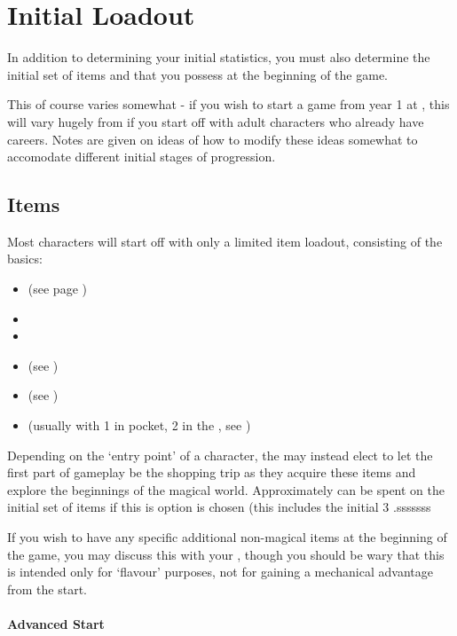 \chapter{Initial Loadout}

In addition to determining your initial statistics, you must also determine the initial set of items and  that you possess at the beginning of the game. 

This of course varies somewhat - if you wish to start a game from year 1 at , this will vary hugely from if you start off with adult characters who already have careers. Notes are given on ideas of how to modify these ideas somewhat to accomodate different initial stages of progression. 

\section{Items}

Most characters will start off with only a limited item loadout, consisting of the basics:

\begin{itemize}
	\item {} (see page \pageref{S:Wandchoosing})
	\item {}
	\item {}
	\item {} (see \pageref{S:Books})
	\item {} (see \pageref{S:Tools})
	\item {} (usually with 1 in pocket, 2 in the , see \pageref{S:Money})
\end{itemize}

Depending on the `entry point' of a character, the  may instead elect to let the first part of gameplay be the  shopping trip as they acquire these items and explore the beginnings of the magical world. Approximately  can be spent on the initial set of items if this is option is chosen (this includes the initial 3 .sssssss

If you wish to have any specific additional non-magical items at the beginning of the game, you may discuss this with your , though you should be wary that this is intended only for `flavour' purposes, not for gaining a mechanical advantage from the start.

\subsubsection{Advanced Start}

